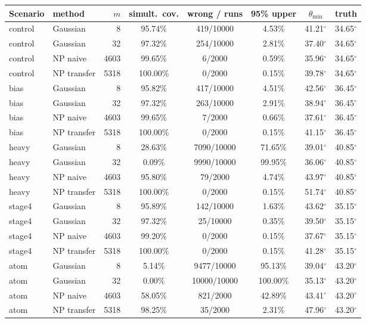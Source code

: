 \begin{tabular}{llrccccc}
\toprule
Scenario & method & $m$ & simult.\ cov. & wrong / runs & 95\% upper & $\theta_{\min}$ & truth \\
\midrule
control & Gaussian & 8 & 95.74\% & 419/10000 & 4.53\% & 41.21$^\circ$ & 34.65$^\circ$ \\
control & Gaussian & 32 & 97.32\% & 254/10000 & 2.81\% & 37.40$^\circ$ & 34.65$^\circ$ \\
control & NP naive & 4603 & 99.65\% & 6/2000 & 0.59\% & 35.96$^\circ$ & 34.65$^\circ$ \\
control & NP transfer & 5318 & 100.00\% & 0/2000 & 0.15\% & 39.78$^\circ$ & 34.65$^\circ$ \\
bias & Gaussian & 8 & 95.82\% & 417/10000 & 4.51\% & 42.56$^\circ$ & 36.45$^\circ$ \\
bias & Gaussian & 32 & 97.32\% & 263/10000 & 2.91\% & 38.94$^\circ$ & 36.45$^\circ$ \\
bias & NP naive & 4603 & 99.65\% & 7/2000 & 0.66\% & 37.61$^\circ$ & 36.45$^\circ$ \\
bias & NP transfer & 5318 & 100.00\% & 0/2000 & 0.15\% & 41.15$^\circ$ & 36.45$^\circ$ \\
heavy & Gaussian & 8 & 28.63\% & 7090/10000 & 71.65\% & 39.01$^\circ$ & 40.85$^\circ$ \\
heavy & Gaussian & 32 & 0.09\% & 9990/10000 & 99.95\% & 36.06$^\circ$ & 40.85$^\circ$ \\
heavy & NP naive & 4603 & 95.80\% & 79/2000 & 4.74\% & 43.97$^\circ$ & 40.85$^\circ$ \\
heavy & NP transfer & 5318 & 100.00\% & 0/2000 & 0.15\% & 51.74$^\circ$ & 40.85$^\circ$ \\
stage4 & Gaussian & 8 & 95.89\% & 142/10000 & 1.63\% & 43.62$^\circ$ & 35.15$^\circ$ \\
stage4 & Gaussian & 32 & 97.32\% & 25/10000 & 0.35\% & 39.50$^\circ$ & 35.15$^\circ$ \\
stage4 & NP naive & 4603 & 99.20\% & 0/2000 & 0.15\% & 37.67$^\circ$ & 35.15$^\circ$ \\
stage4 & NP transfer & 5318 & 100.00\% & 0/2000 & 0.15\% & 41.28$^\circ$ & 35.15$^\circ$ \\
atom & Gaussian & 8 & 5.14\% & 9477/10000 & 95.13\% & 39.04$^\circ$ & 43.20$^\circ$ \\
atom & Gaussian & 32 & 0.00\% & 10000/10000 & 100.00\% & 35.13$^\circ$ & 43.20$^\circ$ \\
atom & NP naive & 4603 & 58.05\% & 821/2000 & 42.89\% & 43.41$^\circ$ & 43.20$^\circ$ \\
atom & NP transfer & 5318 & 98.25\% & 35/2000 & 2.31\% & 47.96$^\circ$ & 43.20$^\circ$ \\
\bottomrule
\end{tabular}
